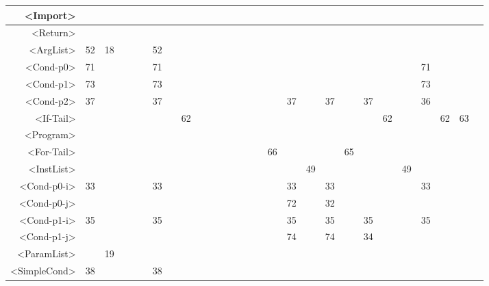 \begin{tabular}{r|c@{ }c@{ }c@{ }c@{ }c@{ }c@{ }c@{ }c@{ }c@{ }c@{ }c@{ }c@{ }c@{ }c@{ }c@{ }c@{ }c@{ }c@{ }c@{ }c@{ }c@{ }c@{ }c@{ }c@{ }c@{ }c@{ }c@{ }}
<Import> &   &   &   &   &   &   &   &   &   &   &   &   &   &   &   &   &   &   &   &   &   &   &   &   &   &   &   \\\hline
<Return> &   &   &   &   &   &   &   &   &   &   &   &   &   &   &   &   &   &   &   &   &   &   &   &   &   &   &   \\\hline
<ArgList> & 52 & 18 &   &   &   & 52 &   &   &   &   &   &   &   &   &   &   &   &   &   &   &   &   &   &   &   &   &   \\\hline
<Cond-p0> & 71 &   &   &   &   & 71 &   &   &   &   &   &   &   &   &   &   &   &   &   &   &   &   &   & 71 &   &   &   \\\hline
<Cond-p1> & 73 &   &   &   &   & 73 &   &   &   &   &   &   &   &   &   &   &   &   &   &   &   &   &   & 73 &   &   &   \\\hline
<Cond-p2> & 37 &   &   &   &   & 37 &   &   &   &   &   &   &   &   &   &   & 37 &   & 37 &   & 37 &   &   & 36 &   &   &   \\\hline
<If-Tail> &   &   &   &   &   &   &   & 62 &   &   &   &   &   &   &   &   &   &   &   &   &   & 62 &   &   & 62 & 63 &   \\\hline
<Program> &   &   &   &   &   &   &   &   &   &   &   &   &   &   &   &   &   &   &   &   &   &   &   &   &   &   &   \\\hline
<For-Tail> &   &   &   &   &   &   &   &   &   &   &   &   &   &   &   & 66 &   &   &   & 65 &   &   &   &   &   &   &   \\\hline
<InstList> &   &   &   &   &   &   &   &   &   &   &   &   &   &   &   &   &   & 49 &   &   &   &   & 49 &   &   &   &   \\\hline
<Cond-p0-i> & 33 &   &   &   &   & 33 &   &   &   &   &   &   &   &   &   &   & 33 &   & 33 &   &   &   &   & 33 &   &   &   \\\hline
<Cond-p0-j> &   &   &   &   &   &   &   &   &   &   &   &   &   &   &   &   & 72 &   & 32 &   &   &   &   &   &   &   &   \\\hline
<Cond-p1-i> & 35 &   &   &   &   & 35 &   &   &   &   &   &   &   &   &   &   & 35 &   & 35 &   & 35 &   &   & 35 &   &   &   \\\hline
<Cond-p1-j> &   &   &   &   &   &   &   &   &   &   &   &   &   &   &   &   & 74 &   & 74 &   & 34 &   &   &   &   &   &   \\\hline
<ParamList> &   & 19 &   &   &   &   &   &   &   &   &   &   &   &   &   &   &   &   &   &   &   &   &   &   &   &   &   \\\hline
<SimpleCond> & 38 &   &   &   &   & 38 &   &   &   &   &   &   &   &   &   &   &   &   &   &   &   &   &   &   &   &   &   \\\hline

\end{tabular}
